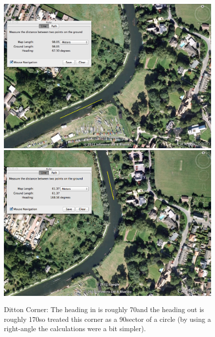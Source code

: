       \begin{figure}[h]
      \begin{center}
        \includegraphics[scale=0.3]{images/DittonCornerHeadingIn.png}
        \includegraphics[scale=0.3]{images/DittonCornerHeadingOut.png}
        \caption{Ditton Corner: The heading in is roughly 70\textdegree and the heading out is roughly 170\textdegree so treated this corner as a 90\textdegree sector of a circle (by using a right-angle the calculations were a bit simpler).}
        \label{fig:dittoncorner:angle}
      \end{center}
      \end{figure}
      
